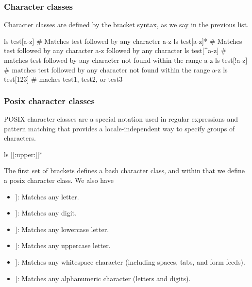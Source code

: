 \documentclass{report}
\begin{document}
    \subsubsection{Character classes}
    \bigbreak \noindent 
    Character classes are defined by the bracket syntax, as we say in the previous list.
    \bigbreak \noindent 
    \begin{bashcode}
        ls test[a-z] # Matches test followed by any character a-z
        ls test[a-z]* # Matches test followed by any character a-z followed by any character
        ls test[^a-z] # matches test followed by any character not found within the range a-z
        ls test[!a-z] # matches test followed by any character not found within the range a-z
        ls test[123] # maches test1, test2, or test3
    \end{bashcode}
    \bigbreak \noindent 
    \subsubsection{Posix character classes}
    \bigbreak \noindent 
    POSIX character classes are a special notation used in regular expressions and pattern matching that provides a locale-independent way to specify groups of characters. 
    \bigbreak \noindent 
    \begin{bashcode}
        ls [[:upper:]]* 
    \end{bashcode}
    \bigbreak \noindent 
    The first set of brackets defines a bash character class, and within that we define a posix character class. We also have
    \begin{itemize}
        \item \relax[[:alpha:]]: Matches any letter.
        \item \relax[[:digit:]]: Matches any digit.
        \item \relax[[:lower:]]: Matches any lowercase letter.
        \item \relax[[:upper:]]: Matches any uppercase letter.
        \item \relax[[:space:]]: Matches any whitespace character (including spaces, tabs, and form feeds).
        \item \relax[[:alnum:]]: Matches any alphanumeric character (letters and digits).
    \end{itemize}






    
\end{document}
